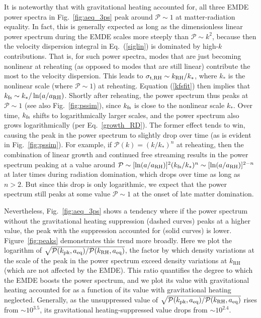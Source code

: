 \documentclass[a4paper,11pt]{article}
\newcommand{\rh}[1]{{#1}_{\mathrm{RH}}}
\newcommand{\kfs}{k_{\rm fs}}
\newcommand{\aeq}{a_{\rm eq}}
\begin{document}
It is noteworthy that with gravitational heating accounted for, all three EMDE power spectra in Fig.~\ref{fig:aeq_3ps} peak around $\mathcal{P}\sim 1$ at matter-radiation equality. In fact, this is generally expected as long as the dimensionless linear power spectrum during the EMDE scales more steeply than $\mathcal{P}\sim k^2$, because then the velocity dispersion integral in Eq.~(\ref{siglin}) is dominated by high-$k$ contributions. That is, for such power spectra, modes that are just becoming nonlinear at reheating (as opposed to modes that are still linear) contribute the most to the velocity dispersion. This leads to $\sigma_{\rm t,RH}\sim \rh{k}/k_*$, where $k_*$ is the nonlinear scale (where $\mathcal{P}\sim 1$) at reheating. Equation (\ref{kfsfit}) then implies that $\kfs\sim k_*/\ln(a/\rh{a})$. Shortly after reheating, the power spectrum thus peaks at $\mathcal{P}\sim 1$ (see also Fig.~\ref{fig:pssim}), since $\kfs$ is close to the nonlinear scale $k_*$. Over time, $\kfs$ shifts to logarithmically larger scales, and the power spectrum also grows logarithmically (per Eq.~\ref{growth_RD}). The former effect tends to win, causing the peak in the power spectrum to slightly drop over time (as is evident in Fig.~\ref{fig:pssim}). For example, if $\mathcal{P}(k) = (k/k_*)^n$ at reheating, then the combination of linear growth and continued free streaming results in the power spectrum peaking at a value around $\mathcal{P}\sim [\ln(a/\rh{a})]^2(\kfs/k_*)^n\sim [\ln(a/\rh{a})]^{2-n}$ at later times during radiation domination, which drops over time as long as $n>2$. But since this drop is only logarithmic, we expect that the power spectrum still peaks at some value $\mathcal{P}\sim 1$ at the onset of late matter domination.


Nevertheless, Fig.~\ref{fig:aeq_3ps} shows a tendency where if the power spectrum without the gravitational heating suppression (dashed curves) peaks at a higher value, the peak with the suppression accounted for (solid curves) is lower. Figure~\ref{fig:peaks} demonstrates this trend more broadly. Here we plot the logarithm of $\sqrt{\mathcal{P}(k_{\rm pk},\aeq) / \mathcal{P}(\rh{k},\aeq) }$, the factor by which density variations at the scale of the peak in the power spectrum exceed density variations at $\rh{k}$ (which are not affected by the EMDE). This ratio quantifies the degree to which the EMDE boosts the power spectrum, and we plot its value with gravitational heating accounted for as a function of its value with gravitational heating neglected. Generally, as the unsuppressed value of $\sqrt{\mathcal{P}(k_{\rm pk},\aeq) / \mathcal{P}(\rh{k},\aeq) }$ rises from $\sim 10^{3.5}$, its gravitational heating-suppressed value drops from $\sim 10^{2.4}$.
\end{document}
